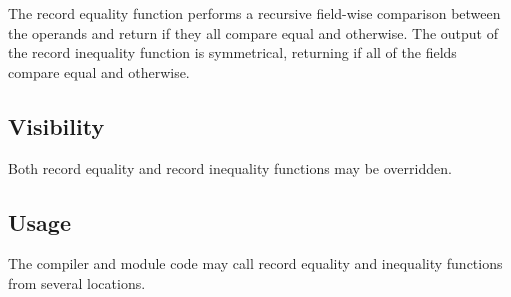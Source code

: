 The record equality function performs a recursive field-wise comparison between the
operands and return  if they all compare equal and  otherwise.  The
output of the record inequality function is symmetrical, returning  if all of
the fields compare equal and  otherwise.

\subsection{Visibility}

Both record equality and record inequality functions may be overridden.

\subsection{Usage}

The compiler and module code may call record equality and inequality functions from
several locations.


